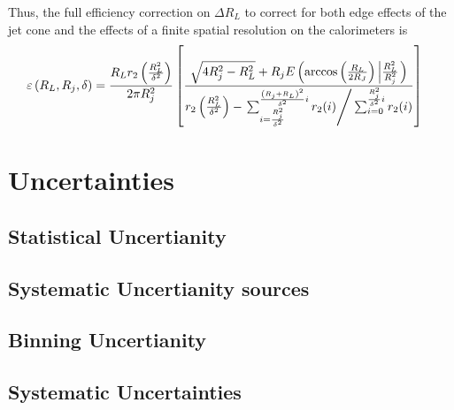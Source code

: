 	Thus, the full efficiency correction on $\Delta R_L$ to correct for both edge effects of the jet cone and the effects of a finite spatial resolution on the calorimeters is 
	\begin{equation}
		\begin{split}
			\varepsilon \left( R_L, R_j, \delta \right) &= \frac{R_L r_2 \left( \frac{R_L^2}{\delta^2} \right)}{2 \pi R_j^2 } \left[  \frac{\sqrt{4 R_j^2 -R_L^2} + R_j E \left( \textrm{arccos} \left( \frac{R_L}{2R_J} \right) \left| \frac{R_L^2}{R_j^2} \right. \right) } {r_2 \left( \frac{R_L^2}{\delta^2} \right) -  \left. \sum^{\frac{\left(R_j + R_L \right)^2}{\delta^2}i}_{i=\frac{R_j^2}{\delta^2}} r_2(i) \right/ \sum^{\frac{R_j^2}{\delta^2}i}_{i=0} r_2(i) }  \right]
		\end{split}
	\end{equation}
\section{Uncertainties}
	\subsection{Statistical Uncertianity}

	\subsection{Systematic Uncertianity sources}
	\subsection{Binning Uncertianity}
	\subsection{Systematic Uncertainties}
